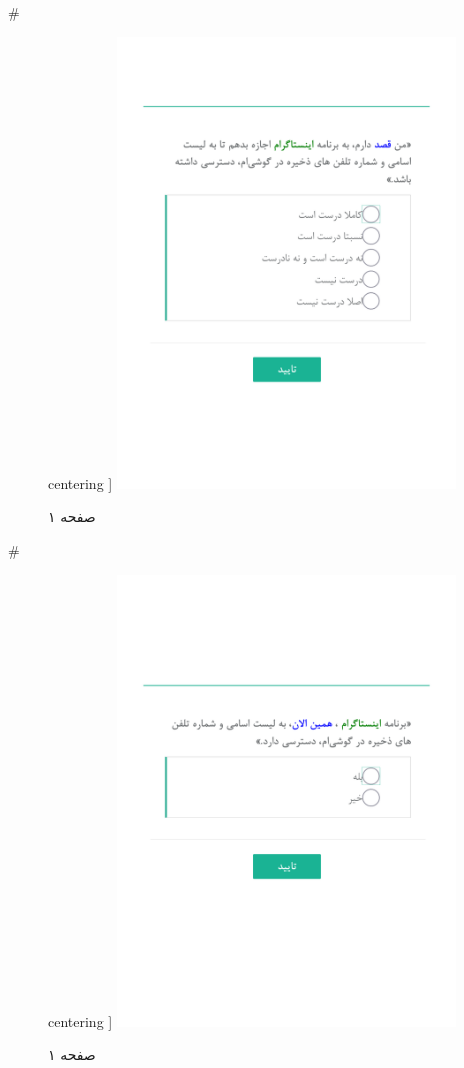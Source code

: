 { 
 # 
\begin{figure}[htpb]
centering ]
\includegraphics[width=0.8\textwidth]{./img/Task54.png/}
\caption{صفحه ۱}
\label{fig:Task1}
\end{figure}
 
 
 # 
\begin{figure}[htpb]
centering ]
\includegraphics[width=0.8\textwidth]{./img/Task55.png/}
\caption{صفحه ۱}
\label{fig:Task1}
\end{figure}
 
}
